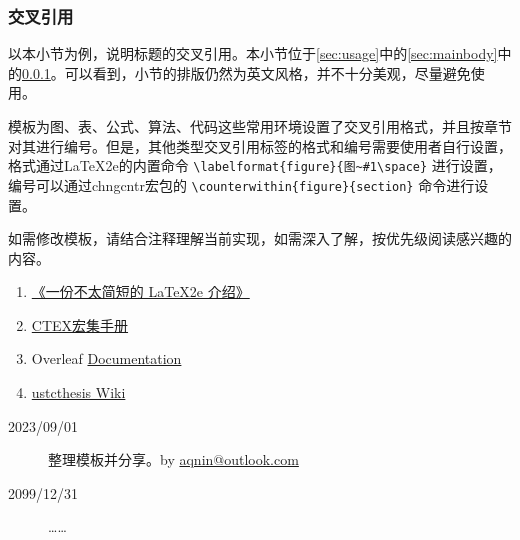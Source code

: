 \documentclass{nkuthesis}
\begin{document}
\subsubsection{交叉引用}\label{sec:crossref}

以本小节为例，说明标题的交叉引用。本小节位于\ref{sec:usage}中的\ref{sec:mainbody}中的\ref{sec:crossref}。可以看到，小节的排版仍然为英文风格，并不十分美观，尽量避免使用。

模板为图、表、公式、算法、代码这些常用环境设置了交叉引用格式，并且按章节对其进行编号。但是，其他类型交叉引用标签的格式和编号需要使用者自行设置，格式通过LaTeX2e的内置命令 \verb|\labelformat{figure}{图~#1\space}| 进行设置，编号可以通过chngcntr宏包的 \verb|\counterwithin{figure}{section}| 命令进行设置。

\appendix

如需修改模板，请结合注释理解当前实现，如需深入了解\LaTeXe，按优先级阅读感兴趣的内容。

\begin{enumerate}
    \item \href{http://mirrors.ctan.org/info/lshort/chinese/lshort-zh-cn.pdf}{《一份不太简短的 LaTeX2e 介绍》}
    \item \href{http://mirrors.ctan.org/language/chinese/ctex/ctex.pdf}{CTEX宏集手册}
    \item Overleaf\cite{lees2015overleaf} \href{https://www.overleaf.com/learn}{Documentation}
    \item  \href{https://github.com/ustctug/ustcthesis/wiki}{ustcthesis Wiki}
\end{enumerate}

\printbibliography

\begin{acknowledgement}

\begin{description}
\item[2023/09/01] 整理模板并分享。by \href{mailto:aqnin@outlook.com}{aqnin@outlook.com}
\item[2099/12/31] ……
\end{description}

\end{acknowledgement}
\end{document}
